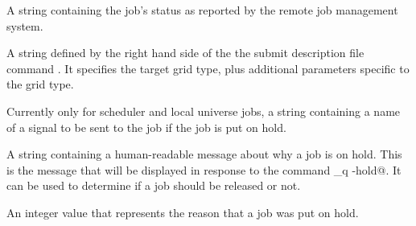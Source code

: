 \begin{description}
\item[\AdAttr{GridJobStatus}:] A string containing the job's status as
reported by the remote job management system.

\item[\AdAttr{GridResource}:] A string defined by the right hand side
of the the submit description file command .
It specifies the target grid type, plus additional parameters
specific to the grid type.

\item[\AdAttr{HoldKillSig}:]    Currently only for scheduler and local
universe jobs,
a string containing a name of
a signal to be sent to the job if the job is put on hold.

\item[\AdAttr{HoldReason}:]    A string containing a human-readable
message about why a job is on hold.
This is the message that will be displayed in response to
the command \verb@condor_q -hold@.
It can be used to determine if a job should be released or not.

\label{HoldReasonCode-job-attribute}
\item[\AdAttr{HoldReasonCode}:]    An integer value that represents the
reason that a job was put on hold.


\end{description}
